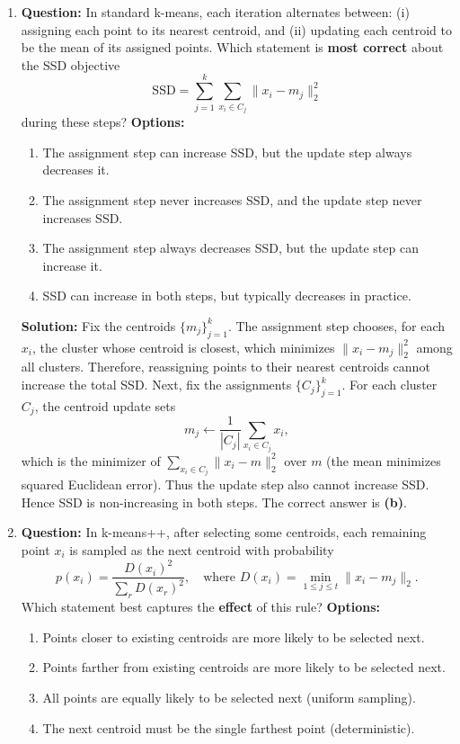 \documentclass{article}
\begin{document}
\begin{enumerate}
\item \textbf{Question:} \newline
In standard k-means, each iteration alternates between:
(i) assigning each point to its nearest centroid, and
(ii) updating each centroid to be the mean of its assigned points.
Which statement is \textbf{most correct} about the SSD objective
\[
\mathrm{SSD} = \sum_{j=1}^k \sum_{x_i \in C_j} \|x_i - m_j\|_2^2
\]
during these steps?
\newline \newline
\textbf{Options:}
\begin{enumerate}
    \item The assignment step can increase SSD, but the update step always decreases it.
    \item The assignment step never increases SSD, and the update step never increases SSD.
    \item The assignment step always decreases SSD, but the update step can increase it.
    \item SSD can increase in both steps, but typically decreases in practice.
\end{enumerate}

\textbf{Solution:} \newline
Fix the centroids $\{m_j\}_{j=1}^k$. The assignment step chooses, for each $x_i$,
the cluster whose centroid is closest, which minimizes $\|x_i - m_j\|_2^2$ among
all clusters. Therefore, reassigning points to their nearest centroids cannot
increase the total SSD. \newline
Next, fix the assignments $\{C_j\}_{j=1}^k$. For each cluster $C_j$, the centroid
update sets
\[
m_j \leftarrow \frac{1}{|C_j|}\sum_{x_i \in C_j} x_i,
\]
which is the minimizer of $\sum_{x_i\in C_j}\|x_i - m\|_2^2$ over $m$ (the mean
minimizes squared Euclidean error). Thus the update step also cannot increase SSD.
Hence SSD is non-increasing in both steps. The correct answer is \textbf{(b)}.


\item \textbf{Question:} \newline
In k-means++, after selecting some centroids, each remaining point $x_i$ is sampled
as the next centroid with probability
\[
p(x_i)=\frac{D(x_i)^2}{\sum_r D(x_r)^2},
\quad\text{where } D(x_i)=\min_{1\le j\le t}\|x_i-m_j\|_2.
\]
Which statement best captures the \textbf{effect} of this rule?
\newline \newline
\textbf{Options:}
\begin{enumerate}
    \item Points closer to existing centroids are more likely to be selected next.
    \item Points farther from existing centroids are more likely to be selected next.
    \item All points are equally likely to be selected next (uniform sampling).
    \item The next centroid must be the single farthest point (deterministic).
\end{enumerate}


\end{enumerate}
\end{document}
